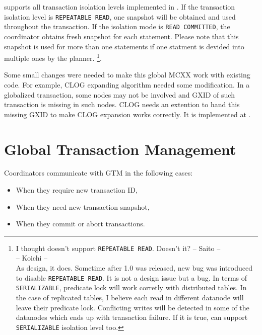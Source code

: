   \XC{} supports all transaction isolation levels implemented in \PG.
  If the transaction isolation level is \texttt{REPEATABLE READ}, one snapshot will be obtained and used
  throughout the transaction.
  If the isolation mode is \texttt{READ COMMITTED}, the coordinator obtains fresh snapshot for each statement.
  Please note that this snapshot is used for more than one statements if one statment is devided into
  multiple ones by the planner.
  \footnote{
	  I thought \XC{} doesn't support \texttt{REPEATABLE READ}. Doesn't it? -- Saito --\\
	  -- Koichi --\\
	  As design, it does.
	  Sometime after 1.0 was released, new bug was introduced to disable \texttt{REPEATABLE READ}.
	  It is not a design issue but a bug.
	  In terms of \texttt{SERIALIZABLE}, predicate lock will work corretly with distributed tables.
	  In the case of replicated tables, I believe each read in different datanode will leave their
	  predicate lock.
	  Conflicting writes will be detected in some of the datanodes which ends up with transaction
	  failure.
	  If it is true, \XC{} can support \texttt{SERIALIZABLE} isolation level too.
  }.
  
  Some small changes were needed to make this global MCXX work with existing \PG{} code.
  For example, CLOG expanding algorithm needed some modification.
  In a globalized transaction, some nodes may not be involved and GXID of such transaction is missing in such nodes.
  CLOG needs an extention to hand this missing GXID to make CLOG expansion works correctly.
  It is implemented at .



\section{\label{sec:gtx}Global Transaction Management}

  Coordinators communicate with GTM in the following cases:

  \begin{itemize}
	  \item When they require new transaction ID,
	  \item When they need new transaction snapshot,
	  \item When they commit or abort transactions.
  \end{itemize}

